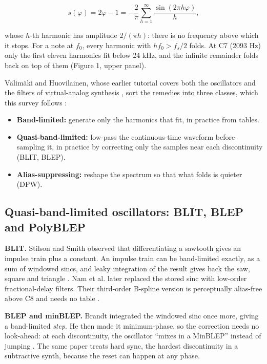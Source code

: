 \documentclass[conference]{IEEEtran}
\begin{document}
\begin{equation*}
s(\varphi) = 2\varphi - 1 = -\frac{2}{\pi}\sum_{h=1}^{\infty} \frac{\sin(2\pi h \varphi)}{h},
\tag{2}
\end{equation*}

whose $h$-th harmonic has amplitude $2/(\pi h)$: there is no frequency above which it stops. For a note at $f_0$, every harmonic with $h f_0 > f_s/2$ folds. At C7 (2093 Hz) only the first eleven harmonics fit below 24 kHz, and the infinite remainder folds back on top of them (Figure 1, upper panel).

Välimäki and Huovilainen, whose earlier tutorial covers both the oscillators and the filters of virtual-analog synthesis \cite{r37}, sort the remedies into three classes, which this survey follows \cite{r38}:

\begin{itemize}
\item \textbf{Band-limited:} generate only the harmonics that fit, in practice from tables.
\item \textbf{Quasi-band-limited:} low-pass the continuous-time waveform before sampling it, in practice by correcting only the samples near each discontinuity (BLIT, BLEP).
\item \textbf{Alias-suppressing:} reshape the spectrum so that what folds is quieter (DPW).
\end{itemize}

\setcounter{subsection}{1}
\subsection{Quasi-band-limited oscillators: BLIT, BLEP and PolyBLEP}
\textbf{BLIT.} Stilson and Smith observed that differentiating a sawtooth gives an impulse train plus a constant. An impulse train can be band-limited exactly, as a sum of windowed sincs, and leaky integration of the result gives back the saw, square and triangle \cite{r32}. Nam et al. later replaced the stored sinc with low-order fractional-delay filters. Their third-order B-spline version is perceptually alias-free above C8 and needs no table \cite{r23}.

\textbf{BLEP and minBLEP.} Brandt integrated the windowed sinc once more, giving a band-limited \emph{step}. He then made it minimum-phase, so the correction needs no look-ahead: at each discontinuity, the oscillator ``mixes in a MinBLEP'' instead of jumping \cite{r4}. The same paper treats hard sync, the hardest discontinuity in a subtractive synth, because the reset can happen at any phase.
\end{document}
